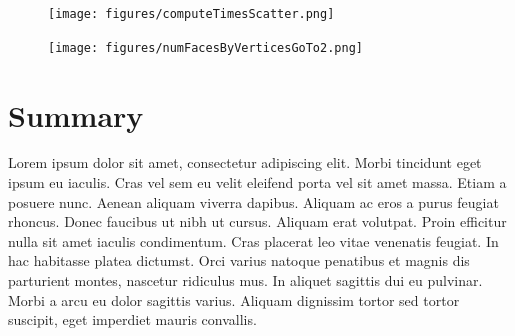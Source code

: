 \begin{figure}[ht]
	\centering
	\texttt{[image: figures/computeTimesScatter.png]}
\end{figure}

\begin{figure}[ht]
	\centering
	\texttt{[image: figures/numFacesByVerticesGoTo2.png]}
\end{figure}





\section{Summary}
Lorem ipsum dolor sit amet, consectetur adipiscing elit. Morbi tincidunt eget 
ipsum eu iaculis. Cras vel sem eu velit eleifend porta vel sit amet massa. Etiam 
a posuere nunc. Aenean aliquam viverra dapibus. Aliquam ac eros a purus feugiat 
rhoncus. Donec faucibus ut nibh ut cursus. Aliquam erat volutpat. Proin efficitur 
nulla sit amet iaculis condimentum. Cras placerat leo vitae venenatis feugiat. In 
hac habitasse platea dictumst. Orci varius natoque penatibus et magnis dis 
parturient montes, nascetur ridiculus mus. In aliquet sagittis dui eu pulvinar. 
Morbi a arcu eu dolor sagittis varius. Aliquam dignissim tortor sed tortor 
suscipit, eget imperdiet mauris convallis.
